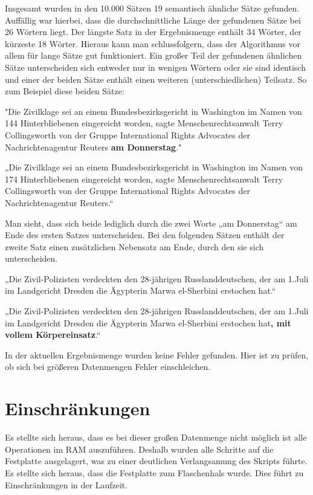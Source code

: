 \documentclass[a4paper,11pt,utf8]{scrartcl}
\begin{document}
Insgesamt wurden in den 10.000 Sätzen 19 semantisch ähnliche Sätze gefunden. Auffällig war hierbei, dass die durchschnittliche Länge der gefundenen Sätze bei 26 Wörtern liegt. Der längste Satz in der Ergebnismenge enthält 34 Wörter, der kürzeste 18 Wörter.  Hieraus kann man schlussfolgern, dass der Algorithmus vor allem für lange Sätze gut funktioniert. Ein großer Teil der gefundenen ähnlichen Sätze unterscheiden sich entweder nur in wenigen Wörtern oder sie sind identisch und einer der beiden Sätze enthält einen weiteren (unterschiedlichen) Teilsatz. So zum Beispiel diese beiden Sätze:

"Die Zivilklage sei an einem Bundesbezirksgericht in Washington im Namen von 144 Hinterbliebenen eingereicht worden, sagte Menschenrechtsanwalt Terry Collingsworth von der Gruppe International Rights Advocates der Nachrichtenagentur Reuters \textbf{am Donnerstag}."

„Die Zivilklage sei an einem Bundesbezirksgericht in Washington im Namen von 174 Hinterbliebenen eingereicht worden, sagte Menschenrechtsanwalt Terry Collingsworth von der Gruppe International Rights Advocates der Nachrichtenagentur Reuters.“

Man sieht, dass sich beide lediglich durch die zwei Worte „am Donnerstag“ am Ende des ersten Satzes unterscheiden. Bei den folgenden Sätzen enthält der zweite Satz einen zusätzlichen Nebensatz am Ende, durch den sie sich unterscheiden.

„Die Zivil-Polizisten verdeckten den 28-jährigen Russlanddeutschen, der am 1.Juli im Landgericht Dresden die Ägypterin Marwa el-Sherbini erstochen hat.“

„Die Zivil-Polizisten verdeckten den 28-jährigen Russlanddeutschen, der am 1.Juli im Landgericht Dresden die Ägypterin Marwa el-Sherbini erstochen hat\textbf{, mit vollem Körpereinsatz}.“

In der aktuellen Ergebnismenge wurden keine Fehler gefunden. Hier ist zu prüfen, ob sich bei größeren Datenmengen Fehler einschleichen. 

\section{Einschränkungen}
Es stellte sich heraus, dass es bei dieser großen Datenmenge nicht möglich ist alle Operationen im RAM auszuführen. Deshalb wurden alle Schritte auf die Festplatte ausgelagert, was zu einer deutlichen Verlangsamung des Skripts führte. Es stellte sich heraus, dass die Festplatte zum Flaschenhals wurde. Dies führt zu Einschränkungen in der Laufzeit. 
\end{document}
